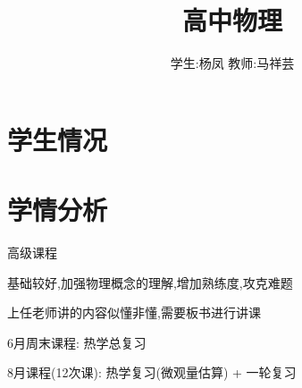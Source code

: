 \documentclass{article}
\title{高中物理}
\author{学生:\quad 杨凤 \quad 教师:\quad 马祥芸}
\begin{document}
    \maketitle
    \tableofcontents
    \newpage

    \section{学生情况}
    \begin{center}
    \end{center}
        
    \section{学情分析}
    高级课程

    基础较好,加强物理概念的理解,增加熟练度,攻克难题

    上任老师讲的内容似懂非懂,需要板书进行讲课

    6月周末课程:
    热学总复习

    8月课程(12次课):
    热学复习(微观量估算) + 一轮复习
\end{document}
